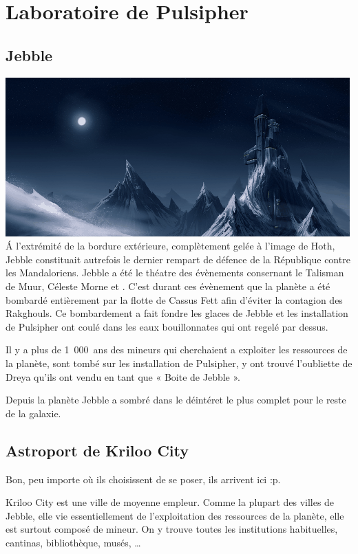 \section{Laboratoire de Pulsipher}

\subsection{Jebble}
\noindent\includegraphics[width=\linewidth]{_img/dos-au-muur/jebble.png}
\'A l'extrémité de la bordure extérieure, complètement gelée à l’image de Hoth, Jebble constituait autrefois le dernier rempart de défence de la République contre les Mandaloriens. Jebble a été le théatre des évènements consernant le Talisman de Muur, Céleste Morne et . C’est durant ces évènement que la planète a été bombardé entièrement par la flotte de Cassus Fett afin d’éviter la contagion des Rakghouls. Ce bombardement a fait fondre les glaces de Jebble et les installation de Pulsipher ont coulé dans les eaux bouillonnates qui ont regelé par dessus.

Il y a plus de 1~000~ans des mineurs qui cherchaient a exploiter les ressources de la planète, sont tombé sur les installation de Pulsipher, y ont trouvé l'oubliette de Dreya qu'ils ont vendu en tant que « Boite de Jebble ».

Depuis la planète Jebble a sombré dans le déintéret le plus complet pour le reste de la galaxie.

\subsection{Astroport de Kriloo City}
Bon, peu importe où ils choisissent de se poser, ils arrivent ici :p.

Kriloo City est une ville de moyenne empleur. Comme la plupart des villes de Jebble, elle vie essentiellement de l’exploitation des ressources de la planète, elle est surtout composé de mineur. On y trouve toutes les institutions habituelles, cantinas, bibliothèque, musés, \ldots

